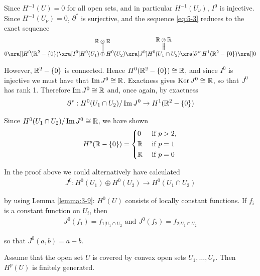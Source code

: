 Since $H^{-1}(U) = 0$ for all open sets, and in particular $H^{-1}(U_\nu)$, $I^0$ is
injective. Since $H^{-1}(U_\nu) = 0$, $\partial^*$ is surjective, and the sequence \eqref{eq:5-3} reduces to
the exact sequence
\begin{align*}
  0\xra[] H^0(\RR^2-\{0\})\xra[I^0] H^0(U_1)
  \hspace*{-1em}\overset{\substack{\displaystyle\RR\otimes\RR\\\big|\!\big|}}{\oplus}\hspace*{-1em} 
  H^0(U_2)\xra[J^0] 
  \overset{\substack{\displaystyle\RR\otimes\RR\\\big|\!\big|}}{H^0(U_1\cap U_2)}
  \xra[\partial^*]H^1(\RR^2-\{0\})\xra[] 0
\end{align*}

However, ${\mathbb{R}}^2-\{0\}$ is connected. Hence $H^0({\mathbb{R}}^2-\{0\}) \cong {\ensuremath{\mathbb{R}}}$, and since $I^0$ is 
injective we must have that $\operatorname{Im} J^0\cong{\ensuremath{\mathbb{R}}}$. Exactness gives $\operatorname{Ker} J^0\cong{\ensuremath{\mathbb{R}}}$, so that $J^0$
has rank 1. Therefore $\operatorname{Im} J^0\cong {\ensuremath{\mathbb{R}}}$ and, once again, by exactness
\begin{align*}
  \partial^*: H^0(U_1\cap U_2)/\operatorname{Im} J^0 \to H^1({\mathbb{R}}^2-\{0\})
\end{align*}

Since $H^0(U_1\cap U_2)/\operatorname{Im} J^0\cong {\ensuremath{\mathbb{R}}}$, we have shown
\begin{align*}
  H^p({\mathbb{R}} - \{0\}) = \left\{\begin{aligned}
    & 0 && \text{ if } p>2,\\
    & {\mathbb{R}} && \text{ if } p = 1 \\
    & {\mathbb{R}} && \text{ if } p = 0
  \end{aligned}\right.
\end{align*}

In the proof above we could alternatively have calculated
\begin{align*}
  J^0:H^0(U_1)\oplus H^0(U_2)\to H^0(U_1\cap U_2)
\end{align*}

by using Lemma \ref{lemma:3-9}: $H^0(U)$ consists of locally constant functions. If $f_i$ is a
constant function on $U_i$, then
\begin{align*}
  J^0(f_1) = f_{1|U_1\cap U_2} \text{ and } J^0(f_2) = f_{2|U_1\cap U_2}
\end{align*}

so that $J^0(a, b) = a - b$.

\begin{theorem}\label{theorem:5-5}
  Assume that the open set $U$ is covered by convex open sets $U_1, \ldots, U_r$. Then $H^p(U)$ is finitely generated.
\end{theorem}

